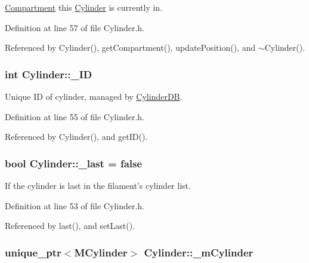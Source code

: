 \hyperlink{classCompartment}{Compartment} this \hyperlink{classCylinder}{Cylinder} is currently in. 



Definition at line 57 of file Cylinder.\+h.



Referenced by Cylinder(), get\+Compartment(), update\+Position(), and $\sim$\+Cylinder().

\hypertarget{classCylinder_ab64067f964d785fe166b8a05e5885065}{
\subsubsection[{\+\_\+\+I\+D}]{\setlength{\rightskip}{0pt plus 5cm}int Cylinder\+::\+\_\+\+I\+D\hspace{0.3cm}{\ttfamily [private]}}}\label{classCylinder_ab64067f964d785fe166b8a05e5885065}


Unique I\+D of cylinder, managed by \hyperlink{classCylinderDB}{Cylinder\+D\+B}. 



Definition at line 55 of file Cylinder.\+h.



Referenced by Cylinder(), and get\+I\+D().

\hypertarget{classCylinder_ae06f9e43f297b9a2fef8b4b08889c852}{
\subsubsection[{\+\_\+last}]{\setlength{\rightskip}{0pt plus 5cm}bool Cylinder\+::\+\_\+last = false\hspace{0.3cm}{\ttfamily [private]}}}\label{classCylinder_ae06f9e43f297b9a2fef8b4b08889c852}


If the cylinder is last in the filament's cylinder list. 



Definition at line 53 of file Cylinder.\+h.



Referenced by last(), and set\+Last().

\hypertarget{classCylinder_acdd582d5e2c3ede46122e1785097e5c3}{
\subsubsection[{\+\_\+m\+Cylinder}]{\setlength{\rightskip}{0pt plus 5cm}unique\+\_\+ptr$<${\bf M\+Cylinder}$>$ Cylinder\+::\+\_\+m\+Cylinder\hspace{0.3cm}{\ttfamily [private]}}}\label{classCylinder_acdd582d5e2c3ede46122e1785097e5c3}


